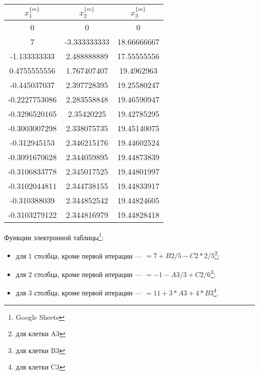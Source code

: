 \documentclass[10pt, a4paper, titlepage]{article}
\begin{document}
\begin{center}
    \begin{tabular}{|c|c|c|}
        \hline
        $x_1^{\{m\}}$ & $x_2^{\{m\}}$ & $x_3^{\{m\}}$ \\ \hline
        
        0 & 0 & 0 \\ \hline
        
        7 & -3.333333333 & 18.66666667 \\ \hline
        
        -1.133333333 & 2.488888889 & 17.55555556 \\ \hline
        
        0.4755555556 & 1.767407407 & 19.4962963 \\ \hline
        
        -0.445037037 & 2.397728395 &19.25580247 \\ \hline
        
        -0.2227753086 & 2.283558848 & 19.46590947 \\ \hline
        
        -0.3296520165 & 2.35420225 & 19.42785295 \\ \hline
        
        -0.3003007298 & 2.338075735 & 19.45140075 \\ \hline
        
        -0.312945153 & 2.346215176 & 19.44602524 \\ \hline
        
        -0.3091670628 & 2.344059895 & 19.44873839 \\ \hline
        
        -0.3106833778 & 2.345017525 & 19.44801997 \\ \hline
        
        -0.3102044811 & 2.344738155 & 19.44833917 \\ \hline
        
        -0.310388039 & 2.344852542 & 19.44824605 \\ \hline
        
        -0.3103279122 & 2.344816979 & 19.44828418 \\ \hline
        
    \end{tabular}
\end{center}

Функции электронной таблицы\footnote{Google Sheets}:
\begin{itemize}
    \item для 1 столбца, кроме первой итерации --- $=7+B2/5-C2*2/5$\footnote{для клетки A3};
    
    \item для 2 столбца, кроме первой итерации  --- $=-1-A3/3+C2/6$\footnote{для клетки B3};
    
    \item для 3 столбца, кроме первой итерации --- $=11+3*A3+4*B3$\footnote{для клетки C3}.
    
\end{itemize}
\end{document}
